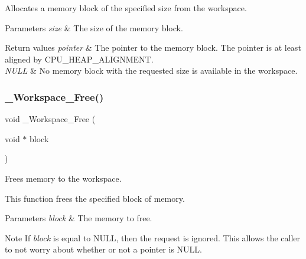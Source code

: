 Allocates a memory block of the specified size from the workspace. 


\begin{DoxyParams}{Parameters}
{\em size} & The size of the memory block.\\
\hline
\end{DoxyParams}

\begin{DoxyRetVals}{Return values}
{\em pointer} & The pointer to the memory block. The pointer is at least aligned by C\+P\+U\+\_\+\+H\+E\+A\+P\+\_\+\+A\+L\+I\+G\+N\+M\+E\+NT. \\
\hline
{\em N\+U\+LL} & No memory block with the requested size is available in the workspace. \\
\hline
\end{DoxyRetVals}
\mbox{\label{group__RTEMSScoreWorkspace_gaa33a3d5dcc07a91d0a6ea948eef2f053}} 
\subsubsection{\texorpdfstring{\_Workspace\_Free()}{\_Workspace\_Free()}}
{\footnotesize\ttfamily void \+\_\+\+Workspace\+\_\+\+Free (\begin{DoxyParamCaption}\item[{void $\ast$}]{block }\end{DoxyParamCaption})}



Frees memory to the workspace. 

This function frees the specified block of memory.


\begin{DoxyParams}{Parameters}
{\em block} & The memory to free.\\
\hline
\end{DoxyParams}
\begin{DoxyNote}{Note}
If {\itshape block} is equal to N\+U\+LL, then the request is ignored. This allows the caller to not worry about whether or not a pointer is N\+U\+LL. 
\end{DoxyNote}
\mbox{\label{group__RTEMSScoreWorkspace_gac10ac71b406698cb4441aff69a80c847}} 
